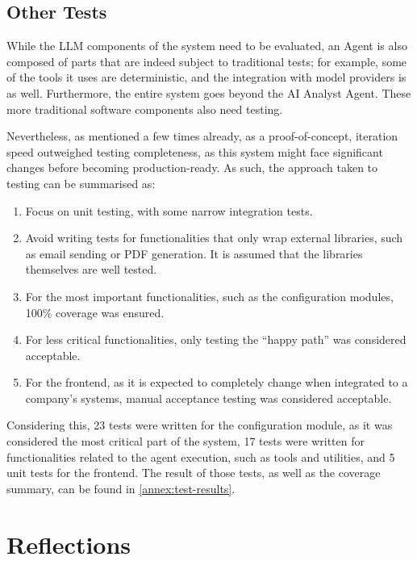\documentclass[a4paper]{report}
\begin{document}
\section{Other Tests}
\label{sec:other-tests}

While the LLM components of the system need to be evaluated, an Agent is also composed of parts that are indeed subject to traditional tests; for example, some of the tools it uses are deterministic, and the integration with model providers is as well. Furthermore, the entire system goes beyond the AI Analyst Agent. These more traditional software components also need testing.

Nevertheless, as mentioned a few times already, as a proof-of-concept, iteration speed outweighed testing completeness, as this system might face significant changes before becoming production-ready. As such, the approach taken to testing can be summarised as:

\begin{enumerate}
    \item Focus on unit testing, with some narrow integration tests.
    \item Avoid writing tests for functionalities that only wrap external libraries, such as email sending or PDF generation. It is assumed that the libraries themselves are well tested.
    \item For the most important functionalities, such as the configuration modules, 100\% coverage was ensured.
    \item For less critical functionalities, only testing the ``happy path'' was considered acceptable.
    \item For the frontend, as it is expected to completely change when integrated to a company's systems, manual acceptance testing was considered acceptable.
\end{enumerate}

Considering this, 23 tests were written for the configuration module, as it was considered the most critical part of the system, 17 tests were written for functionalities related to the agent execution, such as tools and utilities, and 5 unit tests for the frontend. The result of those tests, as well as the coverage summary, can be found in \autoref{annex:test-results}.

\chapter{Reflections}
\label{chapter:reflections}
\end{document}
